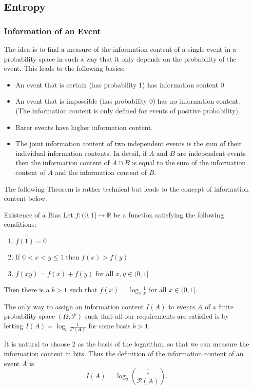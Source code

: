 \documentclass{panikzettel}
\begin{document}
\subsection{Entropy}
\subsubsection{Information of an Event}
The idea is to find a measure of the information content of
a single event in a probability space in such a way that it only depends on the probability of the event. This leads to the following basics:
\begin{itemize}
\item An event that is certain (has probability 1) has information content 0.
\item An event that is impossible (has probability 0) has no information content. (The information content is only defined for events of positive probability).
\item Rarer events have higher information content.
\item The joint information content of two independent events is the sum of their individual information contents. In detail, if $A$ and $B$ are independent events then the information content of $A\cap B$ is equal to the sum of the information content of $A$ and the information content of $B$.
\end{itemize}

The following Theorem is rather technical but leads to the concept of information content below.

\begin{theo}{Existence of a Bias}
Let $f:(0,1]\rightarrow \mathbb{R}$ be a function satisfying the following conditions:
\begin{enumerate}[label=(\roman*)]
\item $f(1)=0$
\item If $0 < x < y \leq 1$ then $f(x)>f(y)$
\item $f(xy)=f(x)+f(y)$ for all $x,y\in (0,1]$
\end{enumerate}
Then there is a $b>1$ such that $f(x)=\log_b \frac{1}{x}$ for all $x\in (0,1]$.
\end{theo}


The only way to assign an information content $I(A)$ to events $A$ of a finite probability space $(\Omega, \mathcal{P})$ such that all our requirements are satisfied is by letting $I(A)=\log_b \frac{1}{\mathcal{P}(A)}$ for some basis $b > 1$.

It is natural to choose 2 as the basis of the logarithm, so that we can measure the information content in bits. Thus the definition of the information content of an event $A$ is
\[
I(A)=\log_2 \left(\frac{1}{\mathcal{P}(A)}\right).
\]
\end{document}
